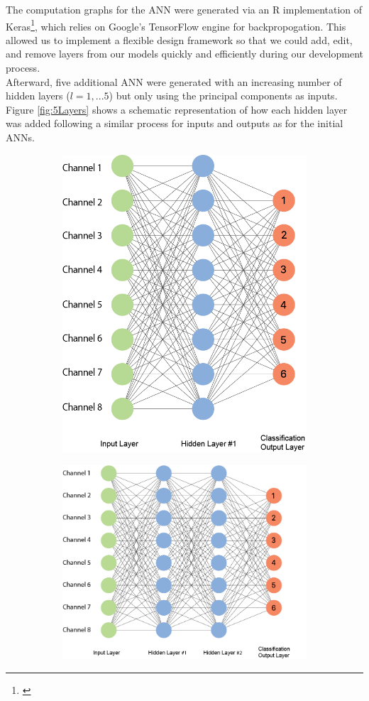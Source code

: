 \documentclass{article}
\begin{document}
The  computation graphs for the ANN were generated via an R implementation of Keras\footnote{\cite{Keras}}, which relies on Google's TensorFlow engine for backpropogation. This allowed us to implement a flexible design framework so that we could  add, edit, and remove layers from our models quickly and efficiently during our development process. \\
Afterward, five additional ANN were generated with an increasing number of hidden layers ($l=1,...5$) but only using the principal components as inputs. Figure \ref{fig:5Layers} shows a schematic representation of how each hidden layer was added following a similar process for inputs and outputs as for the initial ANNs.

\begin{figure}[h]
\centering
\begin{subfigure}{.5\textwidth}
  \centering
  \includegraphics[width=.8\linewidth]{Graphics/1-layer-NN}
\end{subfigure}%
\begin{subfigure}{.6\textwidth}
  \centering
  \includegraphics[width=.9\linewidth]{Graphics/2-layer-NN}

\end{subfigure}
\end{figure}
\end{document}

